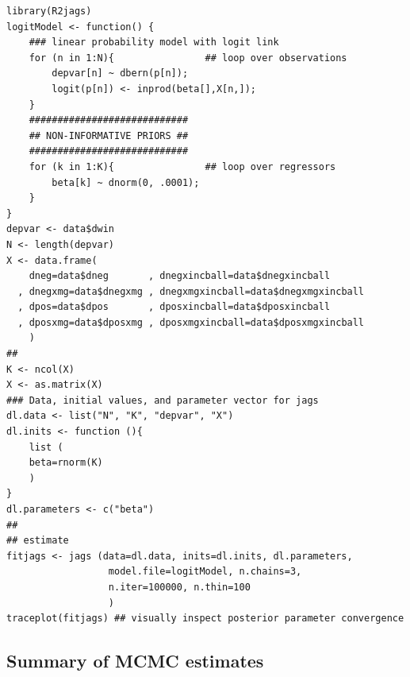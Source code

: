 \documentclass[letter,12pt]{article}
\begin{document}
\begin{scriptsize}
\begin{verbatim}
library(R2jags)
logitModel <- function() {
    ### linear probability model with logit link
    for (n in 1:N){                ## loop over observations
        depvar[n] ~ dbern(p[n]);   
        logit(p[n]) <- inprod(beta[],X[n,]);
    }
    ############################
    ## NON-INFORMATIVE PRIORS ##
    ############################
    for (k in 1:K){                ## loop over regressors
        beta[k] ~ dnorm(0, .0001);
    }
}
depvar <- data$dwin
N <- length(depvar)
X <- data.frame(
    dneg=data$dneg       , dnegxincball=data$dnegxincball
  , dnegxmg=data$dnegxmg , dnegxmgxincball=data$dnegxmgxincball
  , dpos=data$dpos       , dposxincball=data$dposxincball
  , dposxmg=data$dposxmg , dposxmgxincball=data$dposxmgxincball
    )
##
K <- ncol(X)
X <- as.matrix(X)
### Data, initial values, and parameter vector for jags
dl.data <- list("N", "K", "depvar", "X")
dl.inits <- function (){
    list (
    beta=rnorm(K)
    )
}
dl.parameters <- c("beta")
##
## estimate
fitjags <- jags (data=dl.data, inits=dl.inits, dl.parameters,
                  model.file=logitModel, n.chains=3,
                  n.iter=100000, n.thin=100
                  )
traceplot(fitjags) ## visually inspect posterior parameter convergence
\end{verbatim}
\end{scriptsize}

\subsection{Summary of MCMC estimates}
\end{document}
